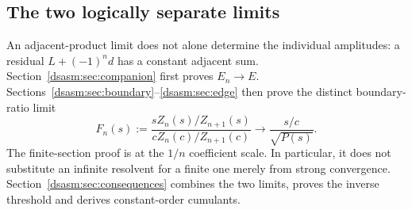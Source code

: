 \documentclass[11pt,letterpaper]{article}
\theoremstyle{remark}\newtheorem{remark}[theorem]{Remark}
\begin{document}
\subsection{The two logically separate limits}
An adjacent-product limit does not alone determine the individual
amplitudes: a residual $L+(-1)^n d$ has a constant adjacent sum.
Section~\ref{dsasm:sec:companion} first proves $E_n\to E$.
Sections~\ref{dsasm:sec:boundary}--\ref{dsasm:sec:edge} then prove the distinct
boundary-ratio limit
\begin{equation}\label{dsasm:Ftarget}
 F_n(s):=\frac{sZ_n(s)/Z_{n+1}(s)}{cZ_n(c)/Z_{n+1}(c)}
 \longrightarrow \frac{s/c}{\sqrt{P(s)}}.
\end{equation}
The finite-section proof is at the $1/n$ coefficient scale. In
particular, it does not substitute an infinite resolvent for a finite
one merely from strong convergence. Section~\ref{dsasm:sec:consequences}
combines the two limits, proves the inverse threshold and derives
constant-order cumulants.
\end{document}
